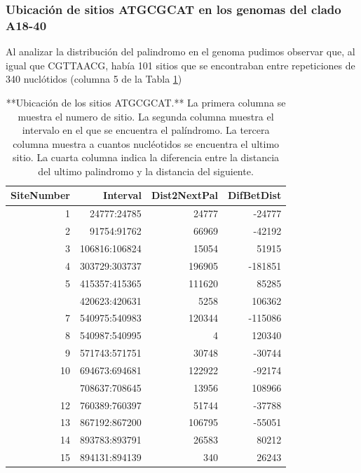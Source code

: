 \documentclass[
]{book}
\begin{document}
\hypertarget{ubicaciuxf3n-de-sitios-atgcgcat-en-los-genomas-del-clado-a18-40}{%
\subsubsection{Ubicación de sitios ATGCGCAT en los genomas del clado A18-40}\label{ubicaciuxf3n-de-sitios-atgcgcat-en-los-genomas-del-clado-a18-40}}

Al analizar la distribución del palindromo en el genoma pudimos observar que, al igual que CGTTAACG, había 101 sitios que se encontraban entre repeticiones de 340 nuclótidos (columna 5 de la Tabla \ref{tab:TAB4})

\begin{table}

\caption{\label{tab:TAB4}**Ubicación de los sitios ATGCGCAT.** La primera columna se muestra el numero de sitio. La segunda columna muestra el intervalo en el que se encuentra el palíndromo. La tercera columna muestra a cuantos nucléotidos se encuentra el ultimo sitio. La cuarta columna indica la diferencia entre la distancia del ultimo palindromo y la distancia del siguiente.}
\centering
\begin{tabular}[t]{rrrr}
\toprule
SiteNumber & Interval & Dist2NextPal & DifBetDist\\
\midrule
1 & 24777:24785 & 24777 & -24777\\
2 & 91754:91762 & 66969 & -42192\\
3 & 106816:106824 & 15054 & 51915\\
4 & 303729:303737 & 196905 & -181851\\
5 & 415357:415365 & 111620 & 85285\\
\addlinespace
6 & 420623:420631 & 5258 & 106362\\
7 & 540975:540983 & 120344 & -115086\\
8 & 540987:540995 & 4 & 120340\\
9 & 571743:571751 & 30748 & -30744\\
10 & 694673:694681 & 122922 & -92174\\
\addlinespace
11 & 708637:708645 & 13956 & 108966\\
12 & 760389:760397 & 51744 & -37788\\
13 & 867192:867200 & 106795 & -55051\\
14 & 893783:893791 & 26583 & 80212\\
15 & 894131:894139 & 340 & 26243\\
\bottomrule
\end{tabular}
\end{table}
\end{document}
